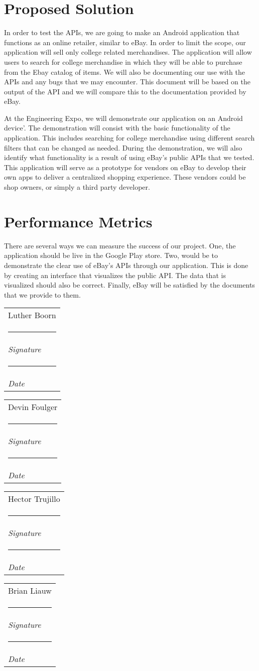 \documentclass[letterpaper, 10pt, draftclsnofoot, onecolumn]{IEEEtran}
\makeatletter
\newcommand{\namesigdate}[2][6cm]{%
  \begin{tabular}{@{}p{#1}@{}}
    #2 \\[0.5\normalbaselineskip] \hrule \\[0pt]
    {\small \textit{Signature}} \\[0.5\normalbaselineskip] \hrule \\[0pt]
    {\small \textit{Date}}
  \end{tabular}
}
\makeatother
\begin{document}
\section*{Proposed Solution}
	In order to test the APIs, we are going to make an Android application that 
	functions as an online retailer, similar to eBay. In order to limit the scope, 
	our application will sell only college related merchandises. The application 
	will allow users to search for college merchandise in which they will be able 
	to purchase from the Ebay catalog of items. We will also be documenting our 
	use with the APIs and any bugs that we may encounter. This document will 
	be based on the output of the API and we will  compare this to the 
	documentation provided by eBay. 
	\par At the Engineering Expo, we will demonstrate our application on an Android
	 device'. The demonstration will consist with the basic functionality of the 
	application. This includes searching for college merchandise using different 
	search filters that can be changed as needed. During the demonstration, we 
	will also identify what functionality is a result of using eBay's public APIs 
	that we tested. This application will serve as a prototype for vendors on eBay 
	to develop their own apps to deliver a centralized shopping experience. These 
	vendors could be shop owners, or simply a third party developer. 

\newpage
\section*{Performance Metrics}
	There are several ways we can measure the success of our project. One, the 
	application should be live in the Google Play store. Two, would be to 
	demonstrate the clear use of eBay's APIs through our application. This is done 
	by creating an interface that visualizes the public API. The data that is 
	visualized should also be correct. Finally, eBay will be satisfied by the 
	documents that we provide to them.


\vspace{2ex}\noindent 
\namesigdate{Luther Boorn} \hfill
\namesigdate{Devin Foulger} \hfill

\vspace{4ex}\noindent
\namesigdate{Hector Trujillo} \hfill
\namesigdate{Brian Liauw} \hfill
\end{document}
